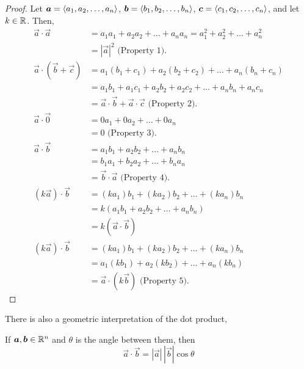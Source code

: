 \begin{proof}
    Let \(\boldsymbol{a} = \left\langle a_1, a_2, \dots, a_n\right\rangle\), \(\boldsymbol{b} = \left\langle b_1, b_2, \dots, b_n\right\rangle\), \(\boldsymbol{c} = \left\langle c_1, c_2, \dots, c_n\right\rangle\), and let \(k\in \mathbb{R}\). Then,
    \begin{align*}
        \vec a \cdot \vec a &= a_1a_1+a_2a_2+\dots+a_na_n=a_1^2+a_2^2+\dots+a_n^2\\&=|\vec a|^2\text{ (Property 1).} \\
        \vec a \cdot (\vec b + \vec c) &= a_1(b_1+c_1)+a_2(b_2+c_2)+\dots+a_n(b_n+c_n) \\
        &= a_1b_1+a_1c_1+a_2b_2+a_2c_2+\dots+a_nb_n+a_nc_n \\
        &= \vec a\cdot \vec b + \vec a \cdot \vec c \text{ (Property 2).} \\
        \vec a \cdot \vec 0 &= 0a_1+0a_2+\dots+0a_n \\ 
        &= 0\text{ (Property 3).} \\
        \vec a \cdot \vec b &= a_1b_1+a_2b_2+\dots+a_nb_n \\
        &= b_1a_1 + b_2a_2+\dots+b_na_n \\
        &= \vec b \cdot \vec a \text{ (Property 4).} \\
        (k\vec a)\cdot \vec b &= (ka_1)b_1+(ka_2)b_2+\dots+(ka_n)b_n \\
        &= k(a_1b_1+a_2b_2+\dots+a_nb_n) \\
        &= k(\vec a \cdot \vec b) \\
        (k\vec a)\cdot \vec b &= (ka_1)b_1+(ka_2)b_2+\dots+(ka_n)b_n \\
        &= a_1(kb_1)+a_2(kb_2)+\dots+a_n(kb_n) \\
        &= \vec a \cdot (k\vec b) \text{ (Property 5).}
    \end{align*}
\end{proof}
There is also a geometric interpretation of the dot product,
\begin{theorem}
    If \(\boldsymbol{a}, \boldsymbol{b}\in \mathbb{R}^n\) and \(\theta\) is the angle between them, then
    \[\vec a\cdot \vec b = |\vec a|\,|\vec b|\cos\theta\]
\end{theorem}

